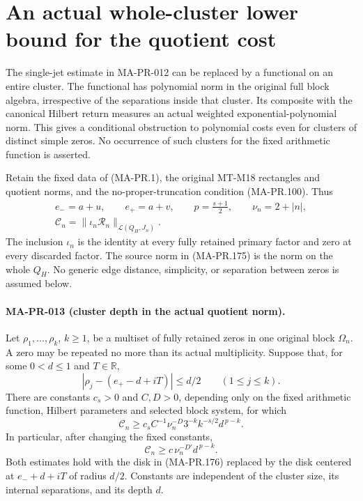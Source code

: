 \section{An actual whole-cluster lower bound for the quotient cost}
\label{sec:cluster-quotient-cost}

The single-jet estimate in MA-PR-012 can be replaced by
a functional on an entire cluster.  The functional has
polynomial norm in the original full block algebra,
irrespective of the separations inside that cluster.
Its composite with the canonical Hilbert return measures
an actual weighted exponential-polynomial norm.  This
gives a conditional obstruction to polynomial costs even
for clusters of distinct simple zeros.  No occurrence
of such clusters for the fixed arithmetic function is
asserted.

Retain the fixed data of (MA-PR.1), the original
MT-M18 rectangles and quotient norms, and the
no-proper-truncation condition (MA-PR.100).  Thus
\[
 \begin{gathered}
 e_-=a+u,\qquad e_+=a+v,\qquad p=\frac{s+1}{2},
 \qquad \nu_n=2+|n|,\\
 \mathcal C_n
   =\|\iota_n\mathscr R_n\|_{\mathcal L(Q_H,J_n)} .
 \end{gathered}
 \tag{MA-PR.175}
\]
The inclusion \(\iota_n\) is the identity at every
fully retained primary factor and zero at every
discarded factor.  The source norm in (MA-PR.175)
is the norm on the whole \(Q_H\).  No generic edge
distance, simplicity, or separation between zeros
is assumed below.

\paragraph{MA-PR-013 (cluster depth in the actual quotient norm).}
Let \(\rho_1,\ldots,\rho_k\), \(k\ge1\), be a multiset
of fully retained zeros in one original block
\(\Omega_n\).  A zero may be repeated no more than
its actual multiplicity.  Suppose that, for some
\(0<d\le1\) and \(T\in\mathbb R\),
\[
       |\rho_j-(e_+-d+iT)|\le d/2
                      \qquad(1\le j\le k).
 \tag{MA-PR.176}
\]
There are constants \(c_s>0\) and \(C,D>0\),
depending only on the fixed arithmetic function,
Hilbert parameters and selected block system, for which
\[
 \mathcal C_n\ge
       c_s C^{-1}\nu_n^{-D}
                   3^{-k}k^{-s/2}d^{\,p-k}.
 \tag{MA-PR.177}
\]
In particular, after changing the fixed constants,
\[
                  \mathcal C_n\ge
                         c\,\nu_n^{-D'}d^{\,p-k}.
 \tag{MA-PR.178}
\]
Both estimates hold with the disk in (MA-PR.176)
replaced by the disk centered at \(e_-+d+iT\)
of radius \(d/2\).  Constants are independent of
the cluster size, its internal separations, and
its depth \(d\).

